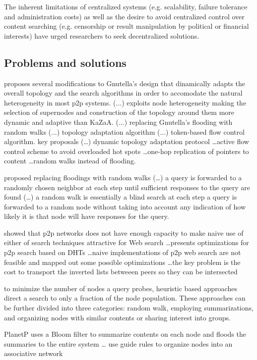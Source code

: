 The inherent limitations of centralized systems (e.g. scalability, failure tolerance and administration costs) as well as the desire to avoid centralized control over content searching (e.g. censorship or result manipulation by political or financial interests) have urged researchers to seek decentralized solutions.


\subsection{Problems and solutions}
\cite{CRB+03} proposes several modifications to Gnutella's design that dinamically adapts the overall topology and the search algorithms in order to accomodate the natural heterogeneity in most p2p systems. (...) exploits node heterogeneity making the selection of supernodes and construction of the topology around them more dynamic and adaptive than KaZaA. (...) replacing Gnutella's flooding with random walks (...) topology adaptation algorithm (...) token-based flow control algorithm. \cite{CRB+03} key proposals (\ldots) dynamic topology adaptation protocol \ldots active flow control scheme to avoid overloaded hot spots \ldots one-hop replication of pointers to content \ldots random walks instead of flooding.

\cite{LCC+02} proposed replacing floodings with random walks (\ldots) a query is forwarded to a randomly chosen neighbor at each step until sufficient responses to the query are found (\ldots) a random walk is essentially a blind search at each step a query is forwarded to a random node without taking into account any indication of how likely it is that node will have responses for the query.

\cite{LLH+03} showed that p2p networks does not have enough capacity to make naive use of either of search techniques attractive for Web search \ldots presents optimizations for p2p search based on DHTs \ldots naive implementations of p2p web search are not feasible and mapped out some possible optimizations \ldots the key problem is the cost to transport the inverted lists betweeen peers so they can be intersected

to minimize the number of nodes a query probes, heuristic based approaches direct a search to only a fraction of the node population. These approaches can be further divided into three categories: random walk, employing summarizations, and organizing nodes with similar contents or sharing interest into groups.

PlanetP \cite{CPM+03} uses a Bloom filter to summarize contents on each node and floods the summaries to the entire system \ldots \cite{CFK07} use guide rules to organize nodes into an associative network

